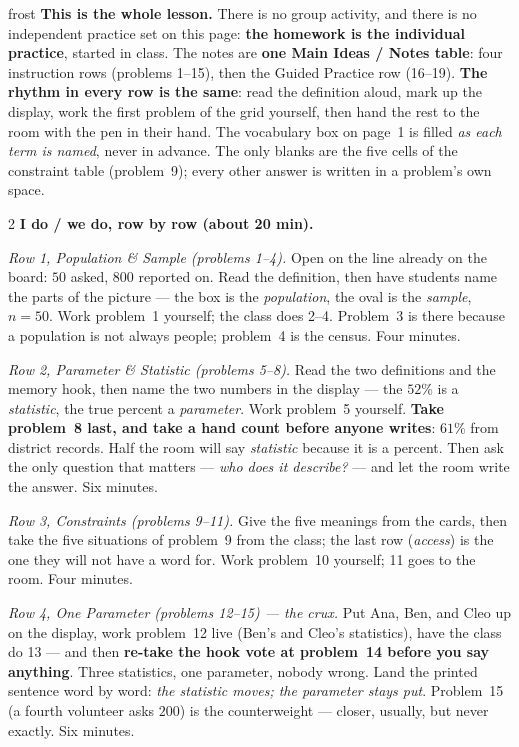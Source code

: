 \documentclass[10pt]{article}
\begin{document}
\boxguard
\begin{skillbox}{frost}
\textbf{This is the whole lesson.} There is no group activity, and there is no independent
practice set on this page: \textbf{the homework is the individual practice}, started in class.
The notes are \textbf{one Main Ideas / Notes table}: four instruction rows (problems 1--15),
then the Guided Practice row (16--19). \textbf{The rhythm in every row is the same}: read the
definition aloud, mark up the display, work the first problem of the grid yourself, then hand
the rest to the room with the pen in their hand. The vocabulary box on page~1 is filled
\emph{as each term is named}, never in advance. The only blanks are the five cells of the
constraint table (problem~9); every other answer is written in a problem's own space.
\begin{multicols}{2}
\textbf{I do / we do, row by row (about 20 min).}

\emph{Row 1, Population \& Sample (problems 1--4).} Open on the line already on the board: $50$
asked, $800$ reported on. Read the definition, then have students name the parts of the
picture --- the box is the \emph{population}, the oval is the \emph{sample}, $n = 50$. Work
problem~1 yourself; the class does 2--4. Problem~3 is there because a population is not
always people; problem~4 is the census. Four minutes.

\emph{Row 2, Parameter \& Statistic (problems 5--8).} Read the two definitions and the memory
hook, then name the two numbers in the display --- the $52\%$ is a \emph{statistic}, the true
percent a \emph{parameter}. Work problem~5 yourself. \textbf{Take problem~8 last, and take a
hand count before anyone writes}: $61\%$ from district records. Half the room will say
\emph{statistic} because it is a percent. Then ask the only question that matters --- \emph{who
does it describe?} --- and let the room write the answer. Six minutes.

\emph{Row 3, Constraints (problems 9--11).} Give the five meanings from the cards, then take
the five situations of problem~9 from the class; the last row (\emph{access}) is the one they
will not have a word for. Work problem~10 yourself; 11 goes to the room. Four minutes.

\emph{Row 4, One Parameter (problems 12--15) --- the crux.} Put Ana, Ben, and Cleo up on the
display, work problem~12 live (Ben's and Cleo's statistics), have the class do 13 --- and then
\textbf{re-take the hook vote at problem~14 before you say anything}. Three statistics, one
parameter, nobody wrong. Land the printed sentence word by word: \emph{the statistic moves;
the parameter stays put}. Problem~15 (a fourth volunteer asks $200$) is the counterweight ---
closer, usually, but never exactly. Six minutes.


\end{multicols}
\end{skillbox}
\end{document}
